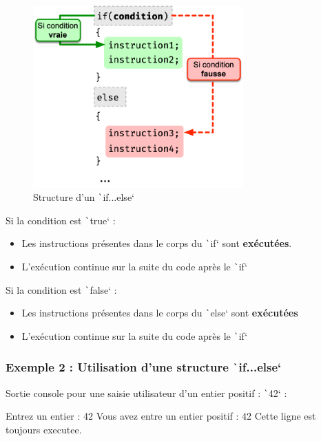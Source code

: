 \documentclass[10pt]{article}
\begin{document}
\smallskip
\begin{multicols}{2}
\begin{figure}[H]
    \includegraphics[max height=7cm,max width = \textwidth/2]{assets/ifElse.jpg}
    \centering
    \caption{Structure d'un \texttt`if...else`}
\end{figure}

Si la condition est \texttt`true` :
\begin{itemize}
    \item Les instructions présentes dans le corps du \texttt`if` sont \textbf{exécutées}.
    \item L'exécution continue sur la suite du code après le \texttt`if`
\end{itemize}
Si la condition est \texttt`false` :
\begin{itemize}
    \item Les instructions présentes dans le corps du \texttt`else` sont \textbf{exécutées}
    \item L'exécution continue sur la suite du code après le \texttt`if` 
\end{itemize}
\end{multicols}

\subsubsection{Exemple 2 : Utilisation d'une structure \texttt`if...else`}
\label{exempleStrucIfElse}

\bigskip
Sortie console pour une saisie utilisateur d'un entier positif : \texttt`42`  :

\begin{textcode}
    Entrez un entier : 42
    Vous avez entre un entier positif : 42
    Cette ligne est toujours executee.
\end{textcode}
\end{document}
